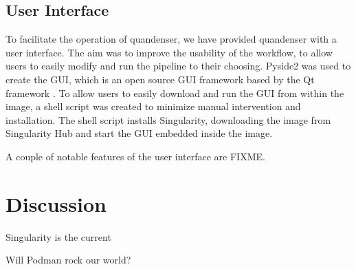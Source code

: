 \documentclass[11pt]{article}
\begin{document}
\subsection*{User Interface}
To facilitate the operation of quandenser, we have provided quandenser with a user interface. The aim was to improve the usability of the workflow, to allow users to easily modify and run the pipeline to their choosing. Pyside2 was used to create the GUI, which is an open source GUI framework based by the Qt framework \cite{pyside2}. To allow users to easily download and run the GUI from within the image, a shell script was created to minimize manual intervention and installation. The shell script installs Singularity, downloading the image from Singularity Hub and start the GUI embedded inside the image.

A couple of notable features of the user interface are FIXME.


\section*{Discussion}

Singularity is the current

Will Podman rock our world?




\end{document}
